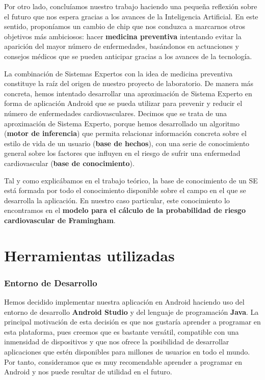 Por otro lado, concluíamos nuestro trabajo haciendo una pequeña reflexión sobre el futuro que nos espera gracias a los avances de la Inteligencia Artificial. En este sentido, proponíamos un cambio de chip que nos conduzca a marcarnos otros objetivos más ambiciosos: hacer \textbf{medicina preventiva} intentando evitar la aparición del mayor número de enfermedades, basándonos en actuaciones y consejos médicos que se pueden anticipar gracias a los avances de la tecnología.

La combinación de Sistemas Expertos con la idea de medicina preventiva constituye la raíz del origen de nuestro proyecto de laboratorio. De manera más concreta, hemos intentado desarrollar una aproximación de Sistema Experto en forma de aplicación Android que se pueda utilizar para prevenir y reducir el número de enfermedades cardiovasculares. Decimos que se trata de una aproximación de Sistema Experto, porque hemos desarrollado un algoritmo (\textbf{motor de inferencia}) que permita relacionar información concreta sobre el estilo de vida de un usuario (\textbf{base de hechos}), con una serie de conocimiento general sobre los factores que influyen en el riesgo de sufrir una enfermedad cardiovascular (\textbf{base de conocimiento}).

Tal y como explicábamos en el trabajo teórico, la base de conocimiento de un SE está formada por todo el conocimiento disponible sobre el campo en el que se desarrolla la aplicación. En nuestro caso particular, este conocimiento lo encontramos en el \textbf{modelo para el cálculo de la probabilidad de riesgo cardiovascular de Framingham}. 

\section{Herramientas utilizadas}

\subsubsection{Entorno de Desarrollo}
Hemos decidido implementar nuestra aplicación en Android haciendo uso del entorno de desarrollo \textbf{Android Studio} y del lenguaje de programación\textbf{ Java}. La principal motivación de esta decisión es que nos gustaría aprender a programar en esta plataforma, pues creemos que es bastante versátil, compatible con una inmensidad de dispositivos y que nos ofrece la posibilidad de desarrollar aplicaciones que estén disponibles para millones de usuarios en todo el mundo. Por tanto, consideramos que es muy recomendable aprender a programar en Android y nos puede resultar de utilidad en el futuro.

